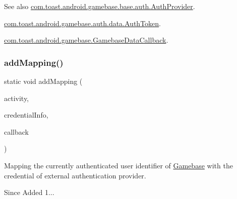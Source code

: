 \begin{DoxySeeAlso}{See also}
\hyperlink{interfacecom_1_1toast_1_1android_1_1gamebase_1_1base_1_1auth_1_1_auth_provider}{com.\+toast.\+android.\+gamebase.\+base.\+auth.\+Auth\+Provider}. 

\hyperlink{classcom_1_1toast_1_1android_1_1gamebase_1_1auth_1_1data_1_1_auth_token}{com.\+toast.\+android.\+gamebase.\+auth.\+data.\+Auth\+Token}. 

\hyperlink{interfacecom_1_1toast_1_1android_1_1gamebase_1_1_gamebase_data_callback}{com.\+toast.\+android.\+gamebase.\+Gamebase\+Data\+Callback}. 
\end{DoxySeeAlso}
\mbox{\label{classcom_1_1toast_1_1android_1_1gamebase_1_1_gamebase_a5152b09c5542e5442ed94f0f541ae1d5}} 
\subsubsection{\texorpdfstring{add\+Mapping()}{addMapping()}\hspace{0.1cm}{\footnotesize\ttfamily [3/3]}}
{\footnotesize\ttfamily static void add\+Mapping (\begin{DoxyParamCaption}\item[{@Non\+Null final Activity}]{activity,  }\item[{@Non\+Null final Map$<$ String, Object $>$}]{credential\+Info,  }\item[{@Nullable final \hyperlink{interfacecom_1_1toast_1_1android_1_1gamebase_1_1_gamebase_data_callback}{Gamebase\+Data\+Callback}$<$ \hyperlink{classcom_1_1toast_1_1android_1_1gamebase_1_1auth_1_1data_1_1_auth_token}{Auth\+Token} $>$}]{callback }\end{DoxyParamCaption})\hspace{0.3cm}{\ttfamily [static]}}



Mapping the currently authenticated user identifier of \hyperlink{classcom_1_1toast_1_1android_1_1gamebase_1_1_gamebase}{Gamebase} with the credential of external authentication provider. 

\begin{DoxySince}{Since}
Added 1... 
\end{DoxySince}

